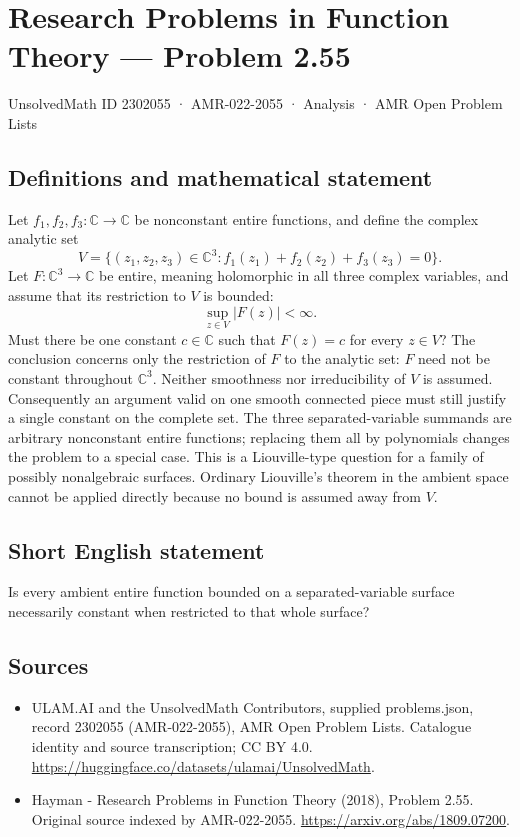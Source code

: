 \documentclass[11pt,a4paper]{article}
\begin{document}
\section*{Research Problems in Function Theory — Problem 2.55}\label{2302055}
{\small UnsolvedMath ID 2302055 · AMR-022-2055 · Analysis · AMR Open Problem Lists}
\subsection{Definitions and mathematical statement}
Let $f_1,f_2,f_3:\mathbb C\to\mathbb C$ be nonconstant entire functions, and define the complex analytic set
\[
V=\{(z_1,z_2,z_3)\in\mathbb C^3:
 f_1(z_1)+f_2(z_2)+f_3(z_3)=0\}.
\]
Let $F:\mathbb C^3\to\mathbb C$ be entire, meaning holomorphic in all three complex variables, and assume that its restriction to $V$ is bounded:
\[
\sup_{z\in V}|F(z)|<\infty.
\]
Must there be one constant $c\in\mathbb C$ such that $F(z)=c$ for every $z\in V$?
The conclusion concerns only the restriction of $F$ to the analytic set: $F$ need not be constant throughout $\mathbb C^3$. Neither smoothness nor irreducibility of $V$ is assumed. Consequently an argument valid on one smooth connected piece must still justify a single constant on the complete set. The three separated-variable summands are arbitrary nonconstant entire functions; replacing them all by polynomials changes the problem to a special case.
This is a Liouville-type question for a family of possibly nonalgebraic surfaces. Ordinary Liouville's theorem in the ambient space cannot be applied directly because no bound is assumed away from $V$.
\subsection{Short English statement}
Is every ambient entire function bounded on a separated-variable surface necessarily constant when restricted to that whole surface?
\subsection{Sources}
\begin{itemize}
\item[S1] ULAM.AI and the UnsolvedMath Contributors, supplied problems.json, record 2302055 (AMR-022-2055), AMR Open Problem Lists. Catalogue identity and source transcription; CC BY 4.0.
\url{https://huggingface.co/datasets/ulamai/UnsolvedMath}.
\item[S2] Hayman - Research Problems in Function Theory (2018), Problem 2.55. Original source indexed by AMR-022-2055.
\url{https://arxiv.org/abs/1809.07200}.
\end{itemize}
\end{document}
